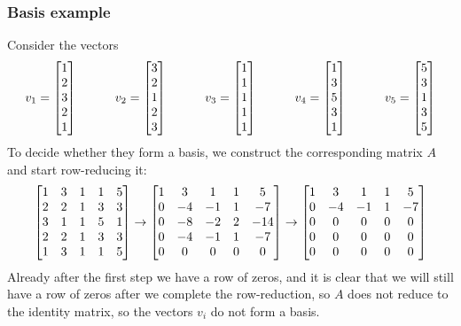 \documentclass[9pt]{beamer}
\begin{document}
\begin{frame}
 \frametitle{Basis example}
 
 Consider the vectors
 \[ 
   v_1 = \left[\begin{matrix} 1\\2\\3\\2\\1 \end{matrix}\right] \hspace{3em}
   v_2 = \left[\begin{matrix} 3\\2\\1\\2\\3 \end{matrix}\right] \hspace{3em}
   v_3 = \left[\begin{matrix} 1\\1\\1\\1\\1 \end{matrix}\right] \hspace{3em}
   v_4 = \left[\begin{matrix} 1\\3\\5\\3\\1 \end{matrix}\right] \hspace{3em}
   v_5 = \left[\begin{matrix} 5\\3\\1\\3\\5 \end{matrix}\right]
 \]
 To decide whether they form a basis, we construct the corresponding
 matrix $A$ and start row-reducing it:
 \[ \left[\begin{matrix} 1&3&1&1&5 \\ 2&2&1&3&3 \\ 3&1&1&5&1 \\ 2&2&1&3&3 \\ 1&3&1&1&5 \end{matrix}\right]
    \to
    \left[\begin{matrix} 1&3&1&1&5 \\ 0&-4&-1&1&-7 \\ 0&-8&-2&2&-14 \\ 0&-4&-1&1&-7 \\ 0&0&0&0&0 \end{matrix}\right]
    \to
    \left[\begin{matrix} 1&3&1&1&5 \\ 0&-4&-1&1&-7 \\ 0&0&0&0&0 \\ 0&0&0&0&0 \\ 0&0&0&0&0 \end{matrix}\right]
 \]
 Already after the first step we have a row of zeros, and it is clear
 that we will still have a row of zeros after we complete the
 row-reduction, so $A$ does not reduce to the identity matrix, so the
 vectors $v_i$ do not form a basis.

\end{frame}
\end{document}
